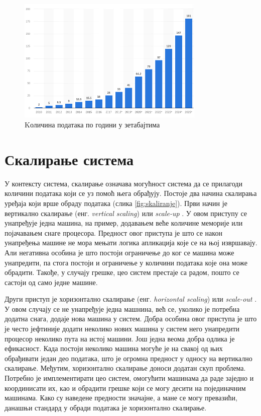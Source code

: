 \documentclass[12pt,oneside]{memoir}
\begin{document}
\begin{figure}[!ht]
  \centering
  \includegraphics[width=0.8\textwidth]{pictures/Total_data_volume_worldwide_2010_2025_statista.png}
  \caption{Kоличина података по години у зетабајтима \cite{volume_data}}
  \label{fig:kolicina_podataka}
\end{figure}

\section{Скалирање система}
\label{sec:skaliranje}

У контексту система, скалирање означава могућност система да се прилагоди количини података који се уз помоћ њега обрађују. Постоје два начина скалирања уређаја који врше обраду података (слика \ref{fig:skaliranje}). Први начин је вертикално скалирање (енг. \textit{vertical scaling}) или \textit{scale-up} \cite{hadoop_beginner}. У овом приступу се унапређује једна машина, на пример, додавањем веће количине меморије или појачавањем снаге процесора. Предност овог приступа је што се након унапређења машине не мора мењати логика апликација које се на њој извршавају. Али негативна особина је што постоји ограничење до ког се машина може унапредити, па стога постоји и ограничење у количини података које она може обрадити. Такође, у случају грешке, цео систем престаје са радом, пошто се састоји од само једне машине.

Други приступ је хоризонтално скалирање (енг. \textit{horizontal scaling}) или \textit{scale-out} \cite{hadoop_beginner}. У овом случају се не унапређује једна машнина, већ се, уколико је потребна додатна снага, додаје нова машина у систем. Добра особина овог приступа је што је често јефтиније додати неколико нових машина у систем него унапредити процесор неколико пута на истој машини. Још једна веома добра одлика је ефикасност. Када постоји неколико машина могуће је на свакој од њих обрађивати један део података, што је огромна предност у односу на вертикално скалирање. Међутим, хоризонтално скалирање доноси додатан скуп проблема. Потребно је имплементирати цео систем, омогућити машинама да раде заједно и координисати их, као и обрадити грешке који се могу десити на појединачним машинама. Како су наведене предности значајне, а мане се могу превазићи, данашњи стандард у обради података је хоризонтално скалирање.
\end{document}
